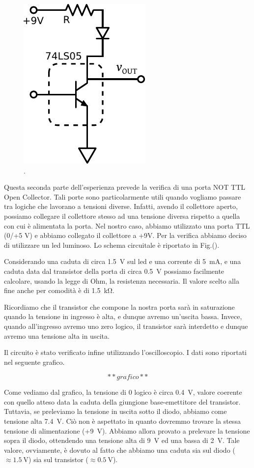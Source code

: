 \begin{figure}
\centering
\includegraphics[width=.12\textwidth]{../E10/latex/open_collector.pdf}
\caption{.}
\label{cir10:open_collector}
\end{figure}

Questa seconda parte dell'esperienza prevede la verifica di una porta NOT TTL Open Collector. Tali porte sono particolarmente utili quando vogliamo passare tra logiche che lavorano a tensioni diverse. Infatti, avendo il collettore aperto, possiamo collegare il collettore stesso ad una tensione diversa rispetto a quella con cui è alimentata la porta. Nel nostro caso, abbiamo utilizzato una porta TTL (0/+5 \si{\volt}) e abbiamo collegato il collettore a +9\si{\volt}. Per la verifica abbiamo deciso di utilizzare un led luminoso. Lo schema circuitale è riportato in Fig.().

Considerando una caduta di circa \SI{1.5}{\volt} sul led e una corrente di \SI{5}{\milli\ampere}, e una caduta data dal transistor della porta di circa \SI{0.5}{\volt} possiamo facilmente calcolare, usando la legge di Ohm, la resistenza necessaria. Il valore scelto alla fine anche per comodità è di \SI{1.5}{\kilo\ohm}.

Ricordiamo che il transistor che compone la nostra porta sarà in saturazione quando la tensione in ingresso è alta, e dunque avremo un'uscita bassa. Invece, quando all'ingresso avremo uno zero logico, il transistor sarà interdetto e dunque avremo una tensione alta in uscita. 

Il circuito è stato verificato infine utilizzando l'oscilloscopio. I dati sono riportati nel seguente grafico. 

$$**grafico**$$

Come vediamo dal grafico, la tensione di 0 logico è circa \SI{0.4}{\volt}, valore coerente con quello atteso data la caduta della giungione base-emettitore del transistor. Tuttavia, se preleviamo la tensione in uscita sotto il diodo, abbiamo come tensione alta \SI{7.4}{\volt}. Ciò non è aspettato in quanto dovremmo trovare la stessa tensione di alimentazione (+\SI{9}{\volt}). Abbiamo allora provato a prelevare la tensione sopra il diodo, ottendendo una tensione alta di \SI{9}{\volt} ed una bassa di \SI{2}{\volt}. Tale valore, ovviamente, è dovuto al fatto che abbiamo una caduta sia sul diodo ($\approx \SI{1.5}{\volt}$) sia sul transistor ($\approx \SI{0.5}{\volt}$). 


